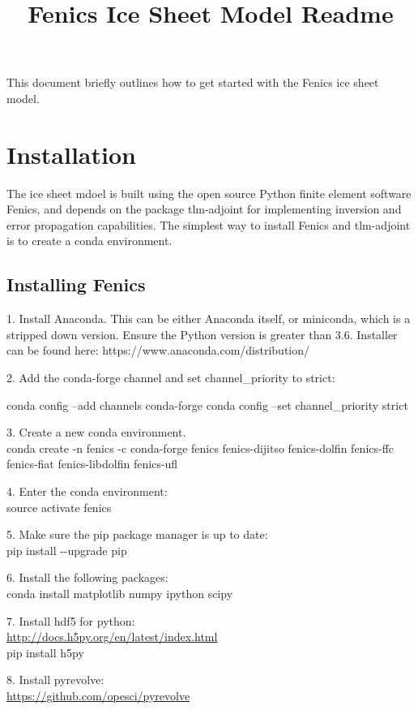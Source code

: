 \documentclass[11pt, reqno, nocenter]{article}
\title{Fenics Ice Sheet Model Readme}
\begin{document}
\maketitle

This document briefly outlines how to get started with the Fenics ice sheet model. 


\section{Installation}

The ice sheet mdoel is built using the open source Python finite element software Fenics, and depends on the package tlm-adjoint for implementing inversion and error propagation capabilities. The simplest way to install Fenics and tlm-adjoint is to create a conda environment. 

\subsection{Installing Fenics}
 
1. Install Anaconda. This can be either Anaconda itself, or miniconda, which is a stripped down version. Ensure the Python version is greater than 3.6. Installer can be found here: https://www.anaconda.com/distribution/ 

2. Add the conda-forge channel and set channel_priority to strict:

conda config --add channels conda-forge
conda config --set channel_priority strict

3. Create a new conda environment. \\
conda create -n fenics -c conda-forge fenics fenics-dijitso fenics-dolfin fenics-ffc fenics-fiat fenics-libdolfin fenics-ufl

4. Enter the conda environment: \\
source activate fenics

5. Make sure the pip package manager is up to date: \\
pip install -{}-upgrade pip

6. Install the following packages: \\
conda install matplotlib numpy ipython scipy 

7. Install hdf5 for python: \\
\url{http://docs.h5py.org/en/latest/index.html} \\
pip install h5py

8. Install pyrevolve: \\
\url{https://github.com/opesci/pyrevolve}
\end{document}
